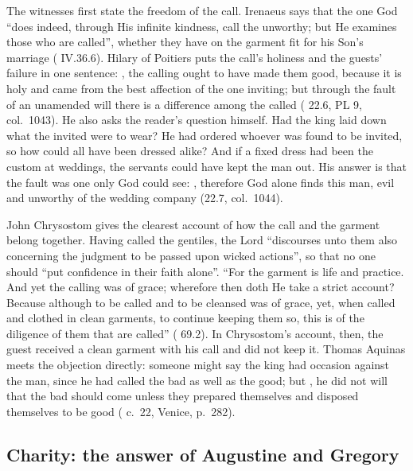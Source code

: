 The witnesses first state the freedom of the call. Irenaeus says that the one
God ``does indeed, through His infinite kindness, call the unworthy; but He
examines those who are called'', whether they have on the garment fit for his
Son's marriage ( IV.36.6). Hilary of Poitiers puts the
call's holiness and the guests' failure in one sentence: ,
the calling ought to have made them good, because it is holy and came from the
best affection of the one inviting; but through the fault of an unamended will
there is a difference among the called ( 22.6,
PL 9, col.~1043). He also asks the reader's question himself. Had the king
laid down what the invited were to wear? He had ordered whoever was found to
be invited, so how could all have been dressed alike? And if a fixed dress had
been the custom at weddings, the servants could have kept the man out. His
answer is that the fault was one only God could see: , therefore God alone finds this man,
evil and unworthy of the wedding company (22.7, col.~1044).

John Chrysostom gives the clearest account of how the call and the garment
belong together. Having called the gentiles, the Lord ``discourses unto them
also concerning the judgment to be passed upon wicked actions'', so that no one
should ``put confidence in their faith alone''. ``For the garment is life and
practice. And yet the calling was of grace; wherefore then doth He take a
strict account? Because although to be called and to be cleansed was of grace,
yet, when called and clothed in clean garments, to continue keeping them so,
this is of the diligence of them that are called'' (
69.2). In Chrysostom's account, then, the guest received a clean garment with
his call and did not keep it. Thomas Aquinas meets the objection directly:
someone might say the king had occasion against the man, since he had called
the bad as well as the good; but , he did not will that the bad should come
unless they prepared themselves and disposed themselves to be good
( c.~22, Venice, p.~282).

\subsection{Charity: the answer of Augustine and Gregory}

